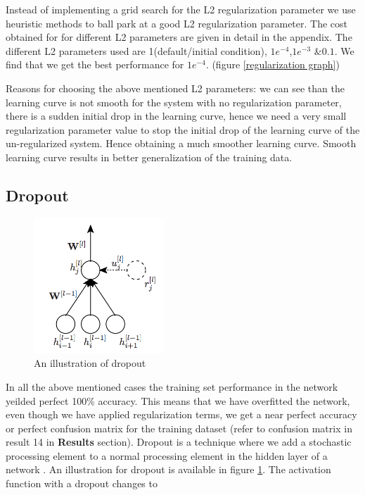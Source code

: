 \documentclass[conference]{IEEEtran}
\begin{document}
Instead of implementing a grid search for the L2 regularization parameter we use heuristic methods to ball park at a good L2 regularization parameter. The cost obtained for for different L2 parameters are given in detail in the appendix. The different L2 parameters used are 1(default/initial condition), $1e^{-4}$,$1e^{-3}$ \&$0.1$. We find that we get the best performance for $1e^{-4}$. (figure \ref{regularization graph})

Reasons for choosing the above mentioned L2 parameters: we can see than the learning curve is not smooth for the system with no regularization parameter, there is a sudden initial drop in the learning curve, hence we need a very small regularization parameter value to stop the initial drop of the learning curve of the un-regularized system. Hence obtaining a much smoother learning curve. Smooth learning curve results in better generalization of the training data. 

\subsection{Dropout}

\begin{figure}[h!]
\centering
\includegraphics[height=2in]{dropout}
\caption{An illustration of dropout \cite{dropout}}
\label{dropout fig}
\end{figure}

In all the above mentioned cases the training set performance in the network yeilded perfect 100\% accuracy. This means that we have overfitted the network, even though we have applied regularization terms, we get a near perfect accuracy or perfect confusion matrix for the training dataset (refer to confusion matrix in result 14 in \textbf{Results} section). Dropout is a technique where we add a stochastic processing element to a normal processing element in the hidden layer of a network \cite{dropout}. An illustration for dropout is available in figure \ref{dropout fig}. The activation function with a dropout changes to 
\end{document}
